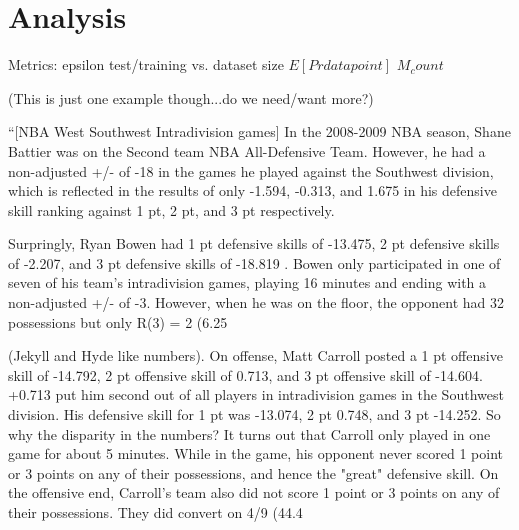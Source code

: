 \documentclass[10pt,twocolumn]{article}
\newcommand{\Elin}[1]{\ensuremath{     \mathrm{E}\left[ #1 \right]   }}
\begin{document}

\section{Analysis}

Metrics:
epsilon
test/training vs. dataset size
$E[Pr{datapoint}]$
$M_count$

(This is just one example though...do we need/want more?)

``[NBA West Southwest Intradivision games] In the 2008-2009 NBA season, Shane Battier was on the Second team NBA All-Defensive Team. However, he had a non-adjusted +/- of -18 in the games he played against the Southwest division, which is reflected in the results of only -1.594, -0.313, and 1.675 in his defensive skill ranking against 1 pt, 2 pt, and 3 pt respectively. 

Surpringly, Ryan Bowen had 1 pt defensive skills of -13.475, 2 pt defensive skills of -2.207, and 3 pt defensive skills of -18.819 . Bowen only participated in one of seven of his team's intradivision games, playing 16 minutes and ending with a non-adjusted +/- of -3. However, when he was on the floor, the opponent had 32 possessions but only R(3) = 2 (6.25%

(Jekyll and Hyde like numbers).
On offense, Matt Carroll posted a 1 pt offensive skill of -14.792, 2 pt offensive skill of 0.713, and 3 pt offensive skill of -14.604. +0.713 put him second out of all players in intradivision games in the Southwest division. His defensive skill for 1 pt was -13.074, 2 pt 0.748, and 3 pt -14.252. So why the disparity in the numbers? It turns out that Carroll only played in one game for about 5 minutes. While in the game, his opponent never scored 1 point or 3 points on any of their possessions, and hence the "great" defensive skill. On the offensive end, Carroll's team also did not score 1 point or 3 points on any of their possessions. They did convert on 4/9 (44.4%
\end{document}
